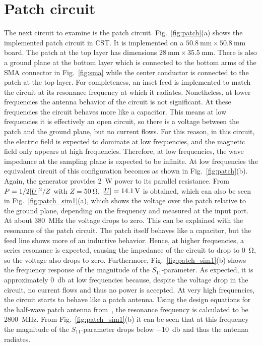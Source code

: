 \section{Patch circuit}
The next circuit to examine is the patch circuit. Fig.~\ref{fig:patch}(a) shows the implemented patch circuit in CST. It is implemented on a $\SI{50.8}{\milli\meter} \times \SI{50.8}{\milli\meter}$ board. The patch at the top layer has dimensions $\SI{28}{\milli\meter} \times \SI{35.5}{\milli\meter}$. There is also a ground plane at the bottom layer which is connected to the bottom arms of the SMA connector in Fig.~\ref{fig:sma} while the center conductor is connected to the patch at the top layer. For completeness, an inset feed is implemented to match the circuit at its resonance frequency at which it radiates. Nonetheless, at lower frequencies the antenna behavior of the circuit is not significant. At these frequencies the circuit behaves more like a capacitor. This means at low frequencies it is effectively an open circuit, so there is a voltage between the patch and the ground plane, but no current flows. For this reason, in this circuit, the electric field is expected to dominate at low frequencies, and the magnetic field only appears at high frequencies. Therefore, at low frequencies, the wave impedance at the sampling plane is expected to be infinite. At low frequencies the equivalent circuit of this configuration becomes as shown in Fig.~\ref{fig:patch}(b). Again, the generator provides \SI{2}{\watt} power to its parallel resistance. From $P = 1/2\lvert\underline{U}\rvert^2/Z$ with $Z = \SI{50}{\ohm}$, $\lvert\underline{U}\rvert = \SI{14.1}{\volt}$ is obtained, which can also be seen in Fig.~\ref{fig:patch_sim1}(a), which shows the voltage over the patch relative to the ground plane, depending on the frequency and measured at the input port. At about \SI{380}{\mega\hertz} the voltage drops to zero. This can be explained with the resonance of the patch circuit. The patch itself behaves like a capacitor, but the feed line shows more of an inductive behavior. Hence, at higher frequencies, a series resonance is expected, causing the impedance of the circuit to drop to \SI{0}{\ohm}, so the voltage also drops to zero. Furthermore, Fig.~\ref{fig:patch_sim1}(b) shows the frequency response of the magnitude of the $S_{11}$-parameter. As expected, it is approximately \SI{0}{\decibel} at low frequencies because, despite the voltage drop in the circuit, no current flows and thus no power is accepted. At very high frequencies, the circuit starts to behave like a patch antenna. Using the design equations for the half-wave patch antenna from~\cite{balanis}, the resonance frequency is calculated to be \SI{2800}{\mega\hertz}. From Fig.~\ref{fig:patch_sim1}(b) it can be seen that at this frequency the magnitude of the $S_{11}$-parameter drops below \SI{-10}{\decibel} and thus the antenna radiates.
